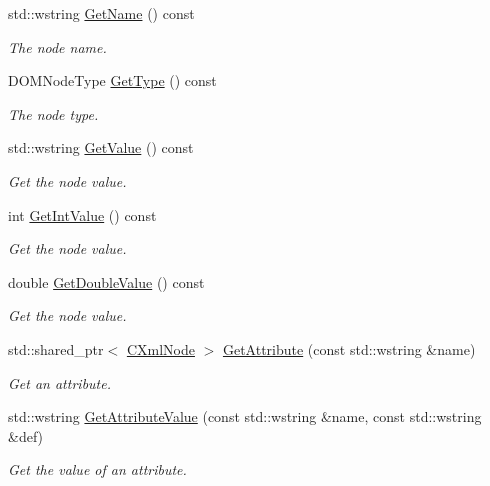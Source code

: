 \begin{DoxyCompactItemize}
std\+::wstring \mbox{\hyperlink{classxmlnode_1_1_c_xml_node_a84d2553bd71bde08ee2a65fb1eedf3a4}{Get\+Name}} () const
\begin{DoxyCompactList}\small\item\em The node name. \end{DoxyCompactList}\item 
D\+O\+M\+Node\+Type \mbox{\hyperlink{classxmlnode_1_1_c_xml_node_ac6a20070f4679d4b7e4e69b844692214}{Get\+Type}} () const
\begin{DoxyCompactList}\small\item\em The node type. \end{DoxyCompactList}\item 
std\+::wstring \mbox{\hyperlink{classxmlnode_1_1_c_xml_node_ac0593ce9fc62dd3e9777506c0c3a84bf}{Get\+Value}} () const
\begin{DoxyCompactList}\small\item\em Get the node value. \end{DoxyCompactList}\item 
int \mbox{\hyperlink{classxmlnode_1_1_c_xml_node_a436c9299f0a8d8ce57d42545cdc4c693}{Get\+Int\+Value}} () const
\begin{DoxyCompactList}\small\item\em Get the node value. \end{DoxyCompactList}\item 
double \mbox{\hyperlink{classxmlnode_1_1_c_xml_node_a8a2b2726257dc82a35fd2f7810c6ccf7}{Get\+Double\+Value}} () const
\begin{DoxyCompactList}\small\item\em Get the node value. \end{DoxyCompactList}\item 
std\+::shared\+\_\+ptr$<$ \mbox{\hyperlink{classxmlnode_1_1_c_xml_node}{C\+Xml\+Node}} $>$ \mbox{\hyperlink{classxmlnode_1_1_c_xml_node_aa571e6a48132a260420a077dde31168f}{Get\+Attribute}} (const std\+::wstring \&name)
\begin{DoxyCompactList}\small\item\em Get an attribute. \end{DoxyCompactList}\item 
std\+::wstring \mbox{\hyperlink{classxmlnode_1_1_c_xml_node_ac4b635b102a0ba6c0f64d047fd27f2a1}{Get\+Attribute\+Value}} (const std\+::wstring \&name, const std\+::wstring \&def)
\begin{DoxyCompactList}\small\item\em Get the value of an attribute. \end{DoxyCompactList}\item 

\end{DoxyCompactItemize}
